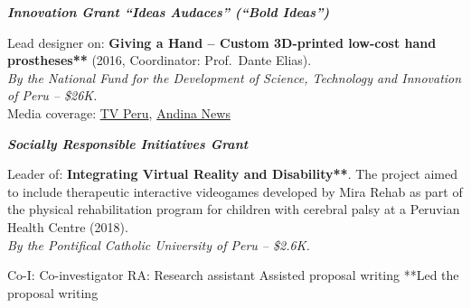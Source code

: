 \documentclass[a4paper,10pt]{article}
\begin{document}
\vspace{4pt}
\textbf{\textit{Innovation Grant ``Ideas Audaces'' (``Bold Ideas'')}}

Lead designer on: \textbf{Giving a Hand -- Custom 3D-printed low-cost hand prostheses**}
(2016, Coordinator: Prof.\ Dante Elias).\\
\textit{By the National Fund for the Development of Science, Technology and Innovation of Peru --
\$26K.}\\
Media coverage:
\href{https://www.youtube.com/watch?v=WlIK1LMIvh8}{TV Peru},
\href{https://www.youtube.com/watch?v=cQpSwX30ggA}{Andina News}

\vspace{4pt}
\textbf{\textit{Socially Responsible Initiatives Grant}}

Leader of: \textbf{Integrating Virtual Reality and Disability**}. The project aimed to include
therapeutic interactive videogames developed by
Mira Rehab as part of the physical rehabilitation program for
children with cerebral palsy at a Peruvian Health Centre (2018).\\
\textit{By the Pontifical Catholic University of Peru -- \$2.6K.}

\vspace{3pt}
\footnotesize
Co-I: Co-investigator \quad RA: Research assistant \quad *Assisted proposal writing \quad
**Led the proposal writing
\normalsize
\end{document}
